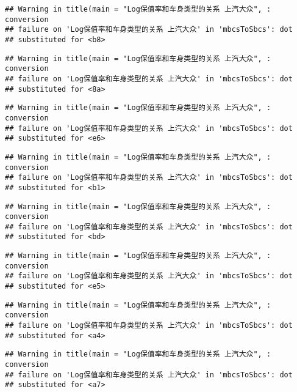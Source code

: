 \documentclass[]{article}
\begin{document}
\begin{verbatim}
## Warning in title(main = "Log保值率和车身类型的关系 上汽大众", : conversion
## failure on 'Log保值率和车身类型的关系 上汽大众' in 'mbcsToSbcs': dot
## substituted for <b8>
\end{verbatim}

\begin{verbatim}
## Warning in title(main = "Log保值率和车身类型的关系 上汽大众", : conversion
## failure on 'Log保值率和车身类型的关系 上汽大众' in 'mbcsToSbcs': dot
## substituted for <8a>
\end{verbatim}

\begin{verbatim}
## Warning in title(main = "Log保值率和车身类型的关系 上汽大众", : conversion
## failure on 'Log保值率和车身类型的关系 上汽大众' in 'mbcsToSbcs': dot
## substituted for <e6>
\end{verbatim}

\begin{verbatim}
## Warning in title(main = "Log保值率和车身类型的关系 上汽大众", : conversion
## failure on 'Log保值率和车身类型的关系 上汽大众' in 'mbcsToSbcs': dot
## substituted for <b1>
\end{verbatim}

\begin{verbatim}
## Warning in title(main = "Log保值率和车身类型的关系 上汽大众", : conversion
## failure on 'Log保值率和车身类型的关系 上汽大众' in 'mbcsToSbcs': dot
## substituted for <bd>
\end{verbatim}

\begin{verbatim}
## Warning in title(main = "Log保值率和车身类型的关系 上汽大众", : conversion
## failure on 'Log保值率和车身类型的关系 上汽大众' in 'mbcsToSbcs': dot
## substituted for <e5>
\end{verbatim}

\begin{verbatim}
## Warning in title(main = "Log保值率和车身类型的关系 上汽大众", : conversion
## failure on 'Log保值率和车身类型的关系 上汽大众' in 'mbcsToSbcs': dot
## substituted for <a4>
\end{verbatim}

\begin{verbatim}
## Warning in title(main = "Log保值率和车身类型的关系 上汽大众", : conversion
## failure on 'Log保值率和车身类型的关系 上汽大众' in 'mbcsToSbcs': dot
## substituted for <a7>
\end{verbatim}
\end{document}
